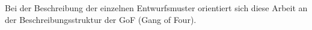



Bei der Beschreibung der einzelnen Entwurfsmuster orientiert sich diese Arbeit an der Beschreibungsstruktur der GoF (Gang of Four).
